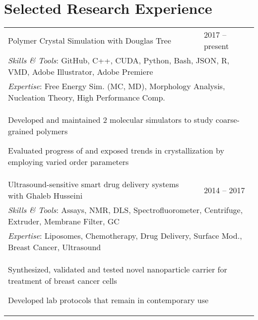 \documentclass[letterpaper,11pt]{article}
\begin{document}
\section*{Selected Research Experience}
\setlength\extrarowheight{-6pt}
\begin{tabular}{@{}p{}l@{}}
  Polymer Crystal Simulation with Douglas Tree & 2017 -- present \\[6pt]
  \multicolumn{2}{p{\textwidth}}{\textit{Skills \& Tools}: GitHub, C++, CUDA, Python, Bash, JSON, R, VMD, Adobe Illustrator, Adobe Premiere} \\[2pt]
  \multicolumn{2}{p{\textwidth}}{\textit{Expertise}: Free Energy Sim. (MC, MD), Morphology Analysis, Nucleation Theory, High Performance Comp.} \\
  \multicolumn{2}{p{\textwidth}}{
    \begin{tabitemize} 
      \item Developed and maintained 2 molecular simulators to study coarse-grained polymers
      \item Evaluated progress of and exposed trends in crystallization by employing varied order parameters
    \end{tabitemize}
  }  \\ 
  Ultrasound-sensitive smart drug delivery systems with Ghaleb Husseini & 2014 -- 2017 \\[6pt]
  \multicolumn{2}{p{\textwidth}}{\textit{Skills \& Tools}: Assays, NMR, DLS, Spectrofluorometer, Centrifuge, Extruder, Membrane Filter, GC} \\[2pt]
  \multicolumn{2}{p{\textwidth}}{\textit{Expertise}: Liposomes, Chemotherapy, Drug Delivery, Surface Mod., Breast Cancer, Ultrasound} \\
  \multicolumn{2}{p{\textwidth}}{
    \begin{tabitemize} 
      \item Synthesized, validated and tested novel nanoparticle carrier for treatment of breast cancer cells
      \item Developed lab protocols that remain in contemporary use
    \end{tabitemize}}\\
\end{tabular} \\
\setlength\extrarowheight{1pt}
\end{document}
